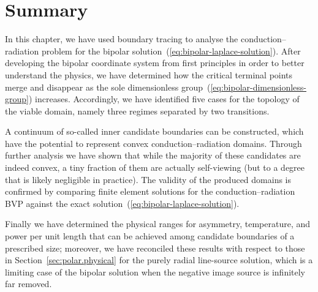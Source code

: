 \section{Summary}
\label{sec:bipolar.summary}

In this chapter, we have used boundary tracing
to analyse the conduction--radiation problem
for the bipolar solution~(\ref{eq:bipolar-laplace-solution}).
After developing the bipolar coordinate system
from first principles
in order to better understand the physics,
we have determined how the critical terminal points merge and disappear
as the sole dimensionless group~(\ref{eq:bipolar-dimensionless-group})
increases.
Accordingly, we have identified five cases
for the topology of the viable domain,
namely three regimes separated by two transitions.

A continuum of so-called inner candidate boundaries can be constructed,
which have the potential to represent convex conduction--radiation domains.
Through further analysis we have shown that
while the majority of these candidates are indeed convex,
a tiny fraction of them are actually self-viewing
(but to a degree that is likely negligible in practice).
The validity of the produced domains is confirmed
by comparing finite element solutions for the conduction--radiation BVP
against the exact solution~(\ref{eq:bipolar-laplace-solution}).

Finally we have determined the physical ranges
for asymmetry, temperature, and power per unit length
that can be achieved
among candidate boundaries of a prescribed size;
moreover, we have reconciled these results
with respect to those in Section~\ref{sec:polar.physical}
for the purely radial line-source solution,
which is a limiting case of the bipolar solution
when the negative image source is infinitely far removed.
